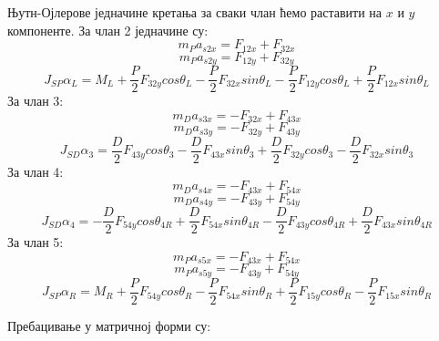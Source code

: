 \documentclass[12pt]{article}
\begin{document}
Њутн-Ојлерове једначине кретања за сваки члан ћемо раставити на $x$ и $y$ компоненте. За члан 2 једначине су:
\begin{equation}
    m_P a_{s2x} = F_{12x}+F_{32x}
\end{equation}
\begin{equation}
    m_P a_{s2y} = F_{12y}+F_{32y}
\end{equation}
\begin{equation}
    J_{SP} \alpha_L = M_L + \dfrac{P}{2}F_{32y}cos\theta_L - \dfrac{P}{2}F_{32x}sin\theta_L - \dfrac{P}{2}F_{12y}cos\theta_L + \dfrac{P}{2}F_{12x}sin\theta_L
\end{equation}
За члан 3:
\begin{equation}
    m_D a_{s3x} = -F_{32x}+F_{43x}
\end{equation}
\begin{equation}
    m_D a_{s3y} = -F_{32y}+F_{43y}
\end{equation}
\begin{equation}
    J_{SD} \alpha_3 = \dfrac{D}{2}F_{43y}cos\theta_3 - \dfrac{D}{2}F_{43x}sin\theta_3 + \dfrac{D}{2}F_{32y}cos\theta_3 - \dfrac{D}{2}F_{32x}sin\theta_3
\end{equation}
За члан 4:
\begin{equation}
    m_D a_{s4x} = -F_{43x}+F_{54x}
\end{equation}
\begin{equation}
    m_D a_{s4y} = -F_{43y}+F_{54y}
\end{equation}
\begin{equation}
    J_{SD} \alpha_4 = - \dfrac{D}{2}F_{54y}cos\theta_{4R} + \dfrac{D}{2}F_{54x}sin\theta_{4R} - \dfrac{D}{2}F_{43y}cos\theta_{4R} + \dfrac{D}{2}F_{43x}sin\theta_{4R}
\end{equation}
За члан 5:
\begin{equation}
    m_P a_{s5x} = -F_{43x}+F_{54x}
\end{equation}
\begin{equation}
    m_P a_{s5y} = -F_{43y}+F_{54y}
\end{equation}
\begin{equation}
    J_{SP} \alpha_R = M_R + \dfrac{P}{2}F_{54y}cos\theta_R - \dfrac{P}{2}F_{54x}sin\theta_R + \dfrac{P}{2}F_{15y}cos\theta_R - \dfrac{P}{2}F_{15x}sin\theta_R
\end{equation}

Пребацивање у матричној форми су:
\end{document}
